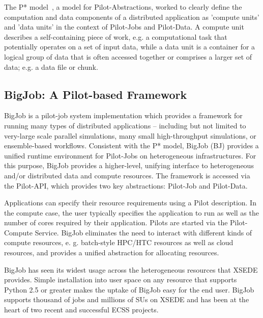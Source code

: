 \documentclass{sig-alternate}
\begin{document}
The P* model~\cite{pstar12}, a model for Pilot-Abstractions, worked to
clearly define the computation and data components of a distributed
application as 'compute units' and 'data units' in the context of
Pilot-Jobs and Pilot-Data. A compute unit describes a self-containing
piece of work, e.g. a computational task that potentially operates on
a set of input data, while a data unit is a container for a logical
group of data that is often accessed together or comprises a larger
set of data; e.g. a data file or chunk.


\subsection{BigJob: A Pilot-based Framework}

BigJob is a pilot-job system implementation which provides a framework
for running many types of distributed applications -- including but
not limited to very-large scale parallel simulations, many small
high-throughput simulations, or ensemble-based workflows. Consistent
with the P* model, BigJob (BJ) provides a unified runtime
environment for Pilot-Jobs on heterogeneous
infrastructures. For this purpose, BigJob provides a higher-level,
unifying interface to heterogeneous and/or distributed data and
compute resources. The framework is accessed via the Pilot-API, which
provides two key abstractions: Pilot-Job and Pilot-Data.

Applications can specify their resource requirements using a Pilot
description. In the compute case, the user typically specifies the
application to run as well as the number of cores required by their
application.  Pilots are started via the Pilot-Compute Service. BigJob 
eliminates the need to interact with different kinds of compute
resources, e. g. batch-style HPC/HTC resources as well as cloud
resources, and provides a unified abstraction for allocating
resources. 

BigJob has seen its widest usage across the heterogeneous resources
that XSEDE provides. Simple installation into user space on any
resource that supports Python 2.5 or greater makes the uptake of
BigJob easy for the end user. BigJob supports thousand of jobs and
millions of SUs on XSEDE and has been at the heart of two recent and
successful ECSS projects.

\end{document}
